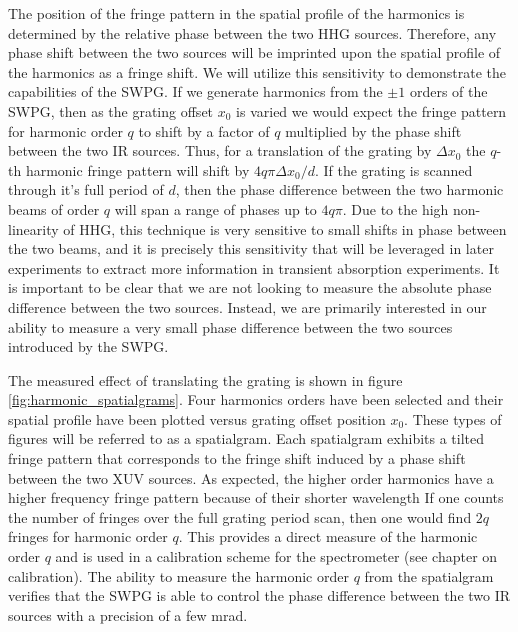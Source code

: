 The position of the fringe pattern in the spatial profile of the harmonics is determined by the relative phase between the two HHG sources.  Therefore, any phase shift between the two sources will be imprinted upon the spatial profile of the harmonics as a fringe shift.  We will utilize this sensitivity to demonstrate the capabilities of the SWPG.  If we generate harmonics from the $\pm1$ orders of the SWPG, then as the grating offset $x_0$ is varied we would expect the fringe pattern for harmonic order $q$ to shift by a factor of $q$ multiplied by the phase shift between the two IR sources. Thus, for a translation of the grating by $\Delta x_0$ the $q$-th harmonic fringe pattern will shift by $4q\pi\Delta x_0/d$.  If the grating is scanned through it's full period of $d$, then the phase difference between the two harmonic beams of order $q$ will span a range of phases up to $4q\pi$.  Due to the high  non-linearity of HHG, this technique is very sensitive to small shifts in phase between the two beams, and it is precisely this sensitivity that will be leveraged in later experiments to extract more information in transient absorption experiments.  It is important to be clear that we are not looking to measure the absolute phase difference between the two sources.  Instead, we are primarily interested in our ability to measure a very small phase difference between the two sources introduced by the SWPG.

The measured effect of translating the grating is shown in figure \ref{fig:harmonic_spatialgrams}. Four harmonics orders have been selected and their spatial profile have been plotted versus grating offset position $x_0$.  These types of figures will be referred to as a spatialgram. Each spatialgram exhibits a tilted fringe pattern that corresponds to the fringe shift induced by a phase shift between the two XUV sources.  As expected, the higher order harmonics have a higher frequency fringe pattern because of their shorter wavelength  If one counts the number of fringes over the full grating period scan, then one would find $2q$ fringes for harmonic order $q$. This provides a direct measure of the harmonic order $q$ and is used in a calibration scheme for the spectrometer (see chapter on calibration).  The ability to measure the harmonic order $q$ from the spatialgram verifies that the SWPG is able to control the phase difference between the two IR sources with a precision of a few mrad.

